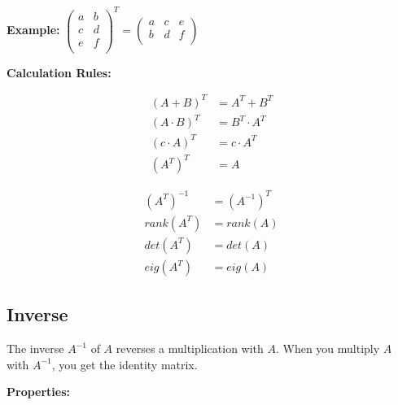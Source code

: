 \documentclass[8pt, a4paper, landscape, includeheadfoot]{extarticle}
\begin{document}
\begin{multicols*}{4}
\begin{center}
\textbf{Example:} 
$\begin{pmatrix}
a & b \\
c & d \\
e & f \\
\end{pmatrix}^T
=
\begin{pmatrix}
a & c & e \\
b & d & f \\
\end{pmatrix}$
\end{center}

\textbf{Calculation Rules:}

\vspace{-5mm}
\begin{minipage}[t]{0.49 \columnwidth}
\begin{align}
(A + B)^T &= A^T + B^T \nonumber \\
(A \cdot B)^T &= B^T \cdot A^T \nonumber \\
(c \cdot A)^T &= c \cdot A^T \nonumber \\
(A^T)^T &= A \nonumber
\end{align}
\end{minipage}
\begin{minipage}[t]{0.49 \columnwidth}
\begin{align}
(A^T)^{-1} &= (A^{-1})^T \nonumber \\
rank(A^T) &= rank(A) \nonumber \\
det(A^T) &= det(A) \nonumber \\
eig(A^T) &= eig(A) \nonumber
\end{align}
\end{minipage}


\subsection{Inverse}

The inverse \( A^{-1} \) of \( A \) reverses a multiplication with \( A \). When you multiply \( A \) with \( A^{-1} \), you get the identity matrix.

\textbf{Properties:}


\end{multicols*}
\end{document}
